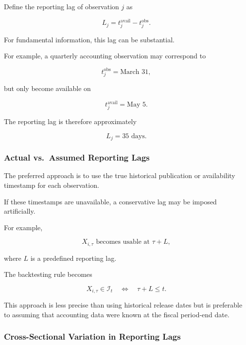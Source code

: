 \documentclass[11pt,a4paper]{article}
\begin{document}
Define the reporting lag of observation $j$ as

\begin{equation}
\boxed{
L_j
=
t_j^{\mathrm{avail}}
-
t_j^{\mathrm{obs}}.
}
\end{equation}

For fundamental information, this lag can be substantial.

For example, a quarterly accounting observation may correspond to

\begin{equation}
t_j^{\mathrm{obs}}
=
\text{March 31},
\end{equation}

but only become available on

\begin{equation}
t_j^{\mathrm{avail}}
=
\text{May 5}.
\end{equation}

The reporting lag is therefore approximately

\begin{equation}
L_j
=
35\text{ days}.
\end{equation}


\subsubsection{Actual vs.\ Assumed Reporting Lags}

The preferred approach is to use the true historical publication or
availability timestamp for each observation.

If these timestamps are unavailable, a conservative lag may be imposed
artificially.

For example,

\begin{equation}
X_{i,\tau}
\text{ becomes usable at }
\tau+L,
\end{equation}

where $L$ is a predefined reporting lag.

The backtesting rule becomes

\begin{equation}
\boxed{
X_{i,\tau}
\in
\mathcal{I}_t
\quad
\Longleftrightarrow
\quad
\tau+L
\leq
t.
}
\end{equation}

This approach is less precise than using historical release dates but is
preferable to assuming that accounting data were known at the fiscal
period-end date.


\subsubsection{Cross-Sectional Variation in Reporting Lags}
\end{document}
